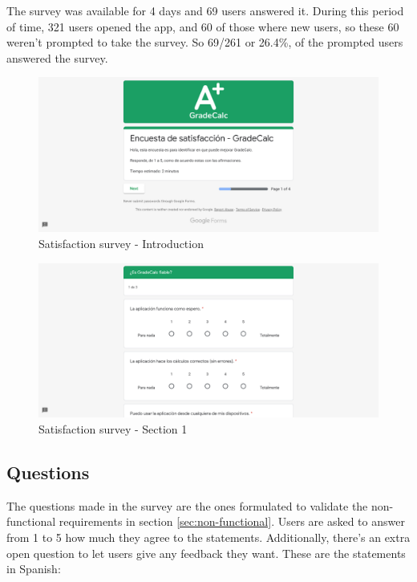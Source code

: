 The survey was available for 4 days and 69 users answered it. During this period of time, 321 users opened the app, and 60 of those where new users, so these 60 weren't prompted to take the survey. So 69/261 or 26.4\%, of the prompted users answered the survey.

\vfill
\begin{figure}[h!]
    \center
    \includegraphics[width=1\columnwidth]{media/survey.png}
    \caption{Satisfaction survey - Introduction}
    \label{fig:screenshot-survey}
\end{figure}
\vfill
\begin{figure}[h!]
    \center
    \includegraphics[width=1\columnwidth]{media/survey-2.png}
    \caption{Satisfaction survey - Section 1}
    \label{fig:screenshot-survey-2}
\end{figure}
\vfill

\clearpage\newpage
\subsection{Questions}
The questions made in the survey are the ones formulated to validate the non-functional requirements in section \ref{sec:non-functional}. Users are asked to answer from 1 to 5 how much they agree to the statements. Additionally, there's an extra open question to let users give any feedback they want. These are the statements in Spanish:

